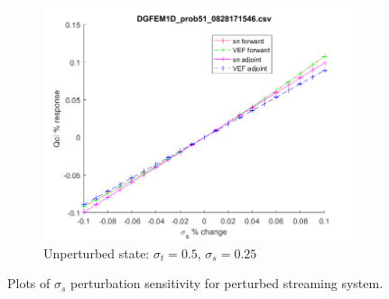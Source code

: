 \documentclass{article}
\newcommand{\sigt}{\sigma_t}
\newcommand{\sigs}{\sigma_s}
\begin{document}
\begin{figure}[H]
\begin{subfigure}{.65\textwidth}
  \centering
  \includegraphics[width=.98\linewidth]{figures/51sigsSens.png}
  \caption{Unperturbed state: $\sigt=0.5$, $\sigs=0.25$}
  \label{fig:sfig3}
\end{subfigure}
\caption{Plots of $\sigs$ perturbation sensitivity for perturbed streaming system.}
\label{fig:fig}
\end{figure}
\end{document}
